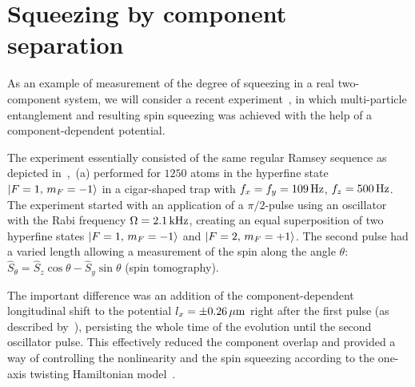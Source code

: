 \section{Squeezing by component separation}

As an example of measurement of the degree of squeezing in a real two-component  system, we will consider a recent experiment~\cite{Riedel2010}, in which multi-particle entanglement and resulting spin squeezing was achieved with the help of a component-dependent potential.

The experiment essentially consisted of the same regular Ramsey sequence as depicted in~,~(a) performed for $1250$ \Rb{} atoms in the hyperfine state ${\mbox{\ensuremath{\left\vert F=1,\, m_F=-1 \right\rangle}}}$ in a cigar-shaped trap with $f_x = f_y = 109\mbox{\ensuremath{\,\mathrm{Hz}}}$, $f_z = 500\mbox{\ensuremath{\,\mathrm{Hz}}}$.
The experiment started with an application of a $\pi/2$-pulse using an oscillator with the Rabi frequency $\Omega=2.1\mbox{\ensuremath{\,\mathrm{kHz}}}$, creating an equal superposition of two hyperfine states ${\mbox{\ensuremath{\left\vert F=1,\, m_F=-1 \right\rangle}}}$ and ${\mbox{\ensuremath{\left\vert F=2,\, m_F=+1 \right\rangle}}}$.
The second pulse had a varied length allowing a measurement of the spin along the angle $\theta$: $\hat{S}_\theta = \hat{S}_z \cos \theta - \hat{S}_y \sin \theta$ (spin tomography).

The important difference was an addition of the component-dependent longitudinal shift to the potential $l_x = \pm 0.26\mbox{\ensuremath{\,\mathrm{\mu m}}}$ right after the first pulse (as described by~), persisting the whole time of the evolution until the second oscillator pulse.
This effectively reduced the component overlap and provided a way of controlling the nonlinearity and the spin squeezing according to the one-axis twisting Hamiltonian model~\cite{Kitagawa1993}.

